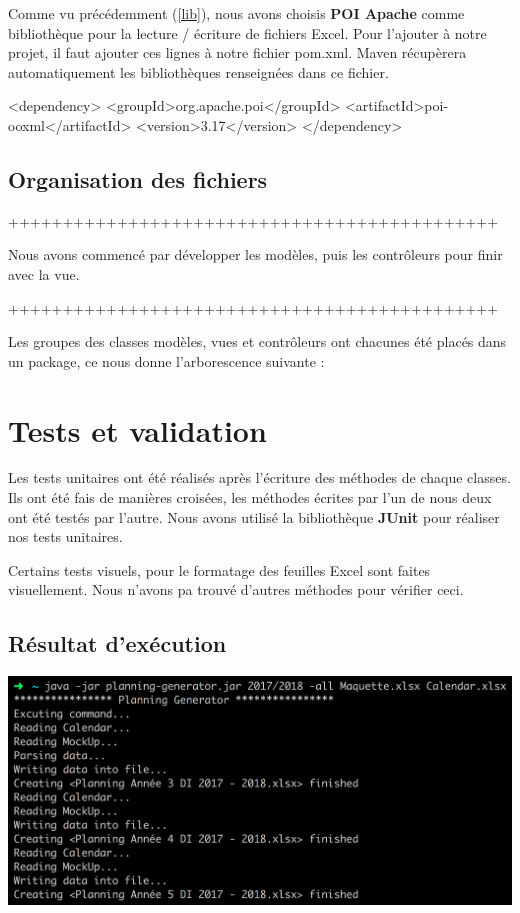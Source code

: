 \documentclass{polytech/polytech}
\begin{document}
	Comme vu précédemment (\ref{lib}), nous avons choisis \textbf{POI Apache} comme bibliothèque pour la lecture / écriture de fichiers Excel.
	Pour l'ajouter à notre projet, il faut ajouter ces lignes à notre fichier pom.xml.
	Maven récupèrera automatiquement les bibliothèques renseignées dans ce fichier.

	\begin{latexsource}
	<dependency>
		<groupId>org.apache.poi</groupId>
		<artifactId>poi-ooxml</artifactId>
		<version>3.17</version>
	</dependency>
	\end{latexsource}

	\subsection{Organisation des fichiers}
	+++++++++++++++++++++++++++++++++++++++++++++

	Nous avons commencé par développer les modèles, puis les contrôleurs pour finir avec la vue.

	+++++++++++++++++++++++++++++++++++++++++++++


	Les groupes des classes modèles, vues et contrôleurs ont chacunes été placés dans un package, ce nous donne l'arborescence suivante :



	\section{Tests et validation}

	Les tests unitaires ont été réalisés après l'écriture des méthodes de chaque classes.
	Ils ont été fais de manières croisées, les méthodes écrites par l'un de nous deux ont été testés par l'autre.
	Nous avons utilisé la bibliothèque \textbf{JUnit} pour réaliser nos tests unitaires.

	Certains tests visuels, pour le formatage des feuilles Excel sont faites visuellement.
	Nous n'avons pa trouvé d'autres méthodes pour vérifier ceci.

	\subsection{Résultat d'exécution}
	\includegraphics[width=\textwidth]{./img/excution_result2.png}
\end{document}
